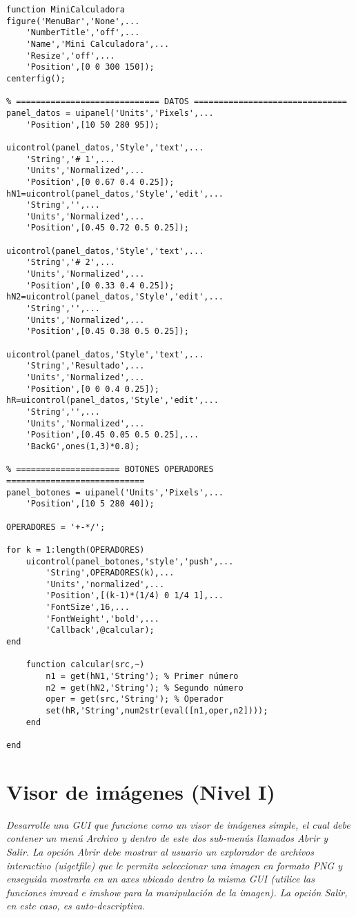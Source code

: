 \begin{verbatim}
function MiniCalculadora
figure('MenuBar','None',...
    'NumberTitle','off',...
    'Name','Mini Calculadora',...
    'Resize','off',...
    'Position',[0 0 300 150]);
centerfig();
 
% ============================= DATOS ===============================
panel_datos = uipanel('Units','Pixels',...
    'Position',[10 50 280 95]);
 
uicontrol(panel_datos,'Style','text',...
    'String','# 1',...
    'Units','Normalized',...
    'Position',[0 0.67 0.4 0.25]);
hN1=uicontrol(panel_datos,'Style','edit',...
    'String','',...
    'Units','Normalized',...
    'Position',[0.45 0.72 0.5 0.25]);
 
uicontrol(panel_datos,'Style','text',...
    'String','# 2',...
    'Units','Normalized',...
    'Position',[0 0.33 0.4 0.25]);
hN2=uicontrol(panel_datos,'Style','edit',...
    'String','',...
    'Units','Normalized',...
    'Position',[0.45 0.38 0.5 0.25]);
 
uicontrol(panel_datos,'Style','text',...
    'String','Resultado',...
    'Units','Normalized',...
    'Position',[0 0 0.4 0.25]);
hR=uicontrol(panel_datos,'Style','edit',...
    'String','',...
    'Units','Normalized',...
    'Position',[0.45 0.05 0.5 0.25],...
    'BackG',ones(1,3)*0.8);
 
% ===================== BOTONES OPERADORES ============================
panel_botones = uipanel('Units','Pixels',...
    'Position',[10 5 280 40]);
 
OPERADORES = '+-*/';
 
for k = 1:length(OPERADORES)
    uicontrol(panel_botones,'style','push',...
        'String',OPERADORES(k),...
        'Units','normalized',...
        'Position',[(k-1)*(1/4) 0 1/4 1],...
        'FontSize',16,...
        'FontWeight','bold',...
        'Callback',@calcular);
end
 
    function calcular(src,~)
        n1 = get(hN1,'String'); % Primer número
        n2 = get(hN2,'String'); % Segundo número
        oper = get(src,'String'); % Operador
        set(hR,'String',num2str(eval([n1,oper,n2])));
    end
 
end
\end{verbatim}

\section{Visor de imágenes (Nivel I)}

\textit{Desarrolle una GUI que funcione como un visor de imágenes simple, el cual debe contener un menú Archivo y dentro de este dos sub-menús llamados Abrir y Salir. La opción Abrir debe mostrar al usuario un explorador de archivos interactivo (uigetfile) que le permita seleccionar una imagen en formato PNG y enseguida mostrarla en un axes ubicado dentro la misma GUI (utilice las funciones imread e imshow para la manipulación de la imagen). La opción Salir, en este caso, es auto-descriptiva.}



